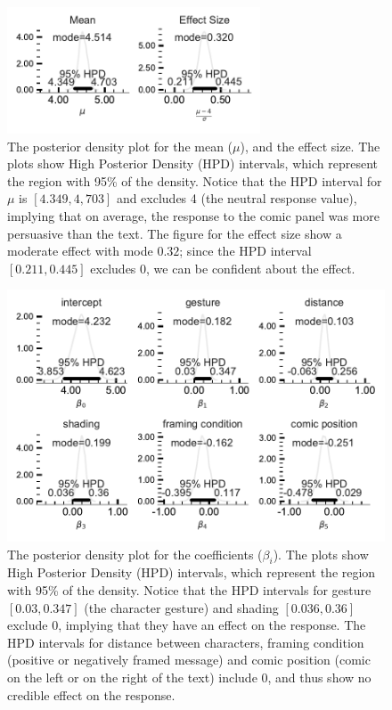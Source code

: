 \begin{figure}
 \includegraphics[width=0.67\textwidth]{./hari-code/mean-effect-main.pdf}
 \caption{The posterior density plot for the mean ($\mu$), and the effect size.  The plots show High Posterior Density (HPD) intervals, which represent the region with 95\% of the density. Notice that the HPD interval for $\mu$ is $[4.349, 4,703]$ and excludes 4 (the neutral response value), implying that on average, the response to the comic panel was more persuasive than the text. The figure for the effect size show a moderate effect with mode $0.32$; since the HPD interval $[0.211, 0.445 ]$ excludes 0, we can be confident about the effect.}
 \label{fig:main-experiment-effect}
\end{figure}

\begin{figure}
 \includegraphics[width=\textwidth]{./hari-code/beta-main.pdf}
 \caption{The posterior density plot for the coefficients ($\beta_i$).  The plots show High Posterior Density (HPD) intervals, which represent the region with 95\% of the density. Notice that the HPD intervals for gesture $[0.03, 0.347]$ (the character gesture) and shading $[0.036, 0.36]$ exclude 0, implying that they have an effect on the response. The HPD intervals for distance between characters, framing condition (positive or negatively framed message) and comic position (comic on the left or on the right of the text) include 0, and thus show no credible effect on the response.}
 \label{fig:beta-main}
\end{figure}
